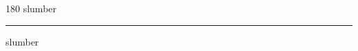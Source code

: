 
\begin{frame}
\begin{center}
\begin{turn}{180}
{\fontsize{2.5cm}{1em}\selectfont slumber}
\end{turn}
\vspace{1em}\par  
\hrule
\vspace{1em}\par  
{\fontsize{2.5cm}{1em}\selectfont slumber}
\end{center}
\end{frame}
